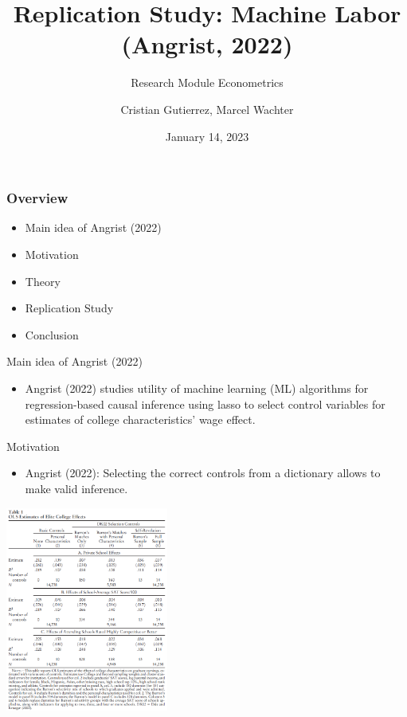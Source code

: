 \documentclass{beamer}
\title{Replication Study: Machine Labor (Angrist, 2022)}
\subtitle {Research Module Econometrics}
\author{Cristian Gutierrez, Marcel Wachter}
\date{January 14, 2023}
\begin{document}
\maketitle

\begin{frame}
\frametitle{Overview} 

\begin{itemize}
    

\item Main idea of Angrist (2022)
\item Motivation
\item Theory
\item Replication Study
\item Conclusion
\end{itemize}
\end{frame}


\begin{frame} {Main idea of Angrist (2022)}
\begin{itemize}
\item  Angrist (2022) studies utility of machine learning (ML) algorithms for regression-based causal inference using lasso to select control variables for estimates of college characteristics' wage effect.
\end{itemize}

\end{frame}






\begin{frame}{Motivation}
\begin{itemize}
    \item Angrist (2022): Selecting the correct controls from a dictionary allows to make valid inference.
\end{itemize}
\includegraphics[width=0.4\textwidth]{Table 1 Angrist (2022).png}
\end{frame}
\end{document}
